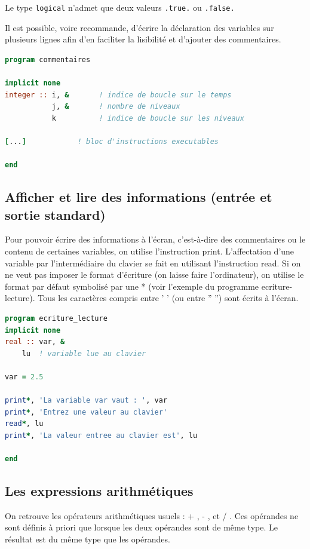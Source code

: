 \documentclass[a4paper,twoside]{article}
\begin{document}
Le type \texttt{logical} n'admet que deux valeurs \texttt{.true.} ou \texttt{.false.}

\begin{remarque}
Il est possible, voire recommande, d'écrire la déclaration des variables sur plusieurs lignes afin d'en faciliter la lisibilité et d'ajouter des commentaires.

\begin{lstlisting}[language=Fortran]
program commentaires 
 
implicit none
integer :: i, &       ! indice de boucle sur le temps
           j, &       ! nombre de niveaux  
           k          ! indice de boucle sur les niveaux 
    
[...]            ! bloc d'instructions executables
  
end
\end{lstlisting}
\end{remarque}

\subsection{Afficher et lire des informations (entrée et sortie standard)}
Pour pouvoir écrire des informations à l'écran, c'est-à-dire des commentaires ou le contenu de certaines variables, on utilise l'instruction print. L'affectation d'une variable par l'intermédiaire du clavier se fait en utilisant l'instruction read. Si on ne veut pas imposer le format d'écriture (on laisse faire l'ordinateur), on utilise le format par défaut symbolisé par une * (voir l'exemple du programme ecriture-lecture). Tous les caractères compris entre ' ' (ou entre ” ”) sont écrits à l'écran.

\begin{lstlisting}[language=Fortran]
program ecriture_lecture
implicit none
real :: var, &
	lu	! variable lue au clavier

var = 2.5

print*, 'La variable var vaut : ', var
print*, 'Entrez une valeur au clavier'
read*, lu
print*, 'La valeur entree au clavier est', lu

end
\end{lstlisting}

\subsection{Les expressions arithmétiques}
On retrouve les opérateurs arithmétiques usuels : \og + \fg, \og - \fg, \og * \fg et \og / \fg. Ces opérandes ne sont définis à priori que lorsque les deux opérandes sont de même type. Le résultat est du même type que les opérandes. 
\end{document}
